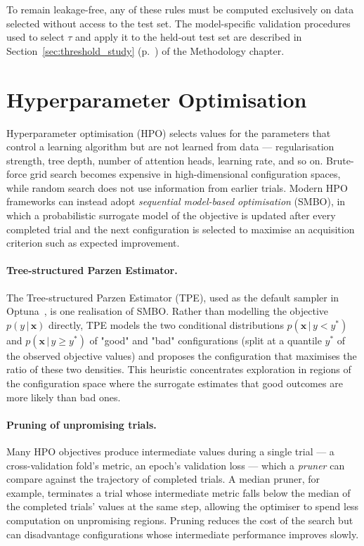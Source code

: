 To remain leakage-free, any of these rules must be computed exclusively on
data selected without access to the test set. The model-specific validation procedures
used to select $\tau$ and apply it to the held-out test set are described in
Section~\ref{sec:threshold_study} (p.~\pageref{sec:threshold_study}) of the Methodology chapter.

\section{Hyperparameter Optimisation}
\label{sec:tb:hpo}

Hyperparameter optimisation (HPO) selects values for the parameters that
control a learning algorithm but are not learned from data --- regularisation
strength, tree depth, number of attention heads, learning rate, and so on.
Brute-force grid search becomes expensive in high-dimensional configuration
spaces, while random search does not use information from earlier trials.
Modern HPO frameworks can instead adopt
\emph{sequential model-based optimisation} (SMBO), in which a probabilistic
surrogate model of the objective is updated after every completed trial and
the next configuration is selected to maximise an acquisition criterion such
as expected improvement.

\paragraph{Tree-structured Parzen Estimator.}
The Tree-structured Parzen Estimator (TPE), used as the default sampler in
Optuna~\cite{akiba2019optuna}, is one realisation of SMBO. Rather than
modelling the objective $p(y\,|\,\mathbf{x})$ directly, TPE models the two
conditional distributions $p(\mathbf{x}\,|\,y < y^{*})$ and
$p(\mathbf{x}\,|\,y \geq y^{*})$ of "good" and "bad" configurations (split at
a quantile $y^{*}$ of the observed objective values) and proposes the
configuration that maximises the ratio of these two densities. This heuristic
concentrates exploration in regions of the configuration space where the
surrogate estimates that good outcomes are more likely than bad ones.

\paragraph{Pruning of unpromising trials.}
Many HPO objectives produce intermediate values during a single trial --- a
cross-validation fold's metric, an epoch's validation loss --- which a
\emph{pruner} can compare against the trajectory of completed trials. A
median pruner, for example, terminates a trial whose intermediate metric
falls below the median of the completed trials' values at the same step,
allowing the optimiser to spend less computation on unpromising regions.
Pruning reduces the cost of the search but can disadvantage configurations
whose intermediate performance improves slowly.

